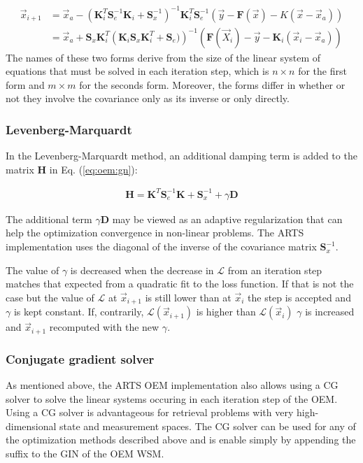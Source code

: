 \begin{eqnarray}
\vec{x}_{i + 1} &= \vec{x}_a - 
\left (\mathbf{K}_i^T \mathbf{S}_e^{-1} \mathbf{K}_i + \mathbf{S}_x^{-1} \right )^{-1} \mathbf{K}_i^T\mathbf{S}_e^{-1}
\left(\vec{y} - \mathbf{F}(\vec{x}) - K(\vec{x} - \vec{x}_a) \right ) \\
&= \vec{x}_a  + \mathbf{S}_x \mathbf{K}_i ^ T
 \left (\mathbf{K}_i \mathbf{S}_x \mathbf{K}_i^T + \mathbf{S}_e) \right )^{-1}
\left ( \mathbf{F}(\vec{X}_i) - \vec{y} - \mathbf{K}_i(\vec{x}_i - \vec{x}_a) \right)
\end{eqnarray}
The names of these two forms derive from the size of the linear system of equations
that must be solved in each iteration step, which is $n \times n$ for the first
form and $m \times m$ for the seconds form. Moreover, the forms differ in whether
or not they involve the covariance only as its inverse or only directly.

\subsubsection{Levenberg-Marquardt}
In the Levenberg-Marquardt method, an additional damping term is added to the
matrix $\mathbf{H}$ in Eq. (\ref{eq:oem:gn}):


\begin{eqnarray}
\mathbf{H} = \mathbf{K}^T\mathbf{S}_e^{-1}\mathbf{K} + \mathbf{S}_x^{-1} +\gamma\mathbf{D}
\end{eqnarray}

The additional term $\gamma \mathbf{D}$ may be viewed as an adaptive regularization that
can help the optimization convergence in non-linear problems. The ARTS implementation
uses the diagonal of the inverse of the covariance matrix $\mathbf{S}_x^{-1}$.

The value of $\gamma$ is decreased when the decrease in $\mathcal{L}$ from an iteration
step matches that expected from a quadratic fit to the loss function. If that is not
the case but the value of $\mathcal{L}$ at $\vec{x}_{i + 1}$ is still lower than at
$\vec{x}_i$ the step is accepted and $\gamma$ is kept constant. If, contrarily, 
$\mathcal{L}(\vec{x}_{i+1})$ is higher than  $\mathcal{L}(\vec{x}_i)$
 $\gamma$ is increased and $\vec{x}_{i+1}$  recomputed with the new $\gamma$.


\subsubsection{Conjugate gradient solver}
\label{sec:oem:cg}
As mentioned above, the ARTS OEM implementation also allows using a CG solver
to solve the linear systems occuring in each iteration step of the OEM. Using
a CG solver is advantageous for retrieval problems with very high-dimensional
state and measurement spaces. The CG solver can be used for any of the optimization
methods described above and is enable simply by appending the  suffix
to the  GIN of the OEM WSM.

